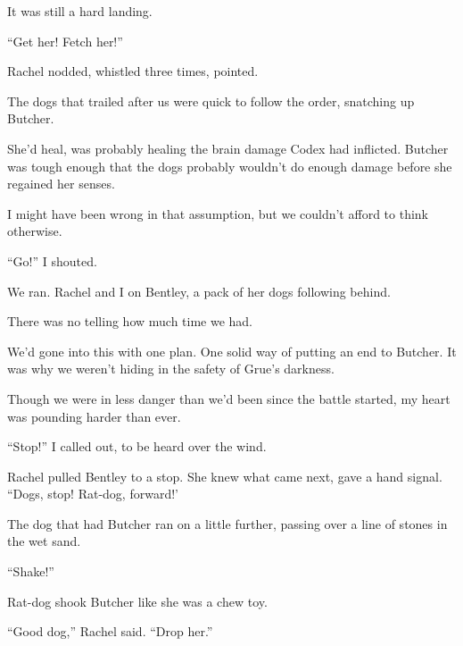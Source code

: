 It was still a hard landing.



``Get her!  Fetch her!''



Rachel nodded, whistled three times, pointed.



The dogs that trailed after us were quick to follow the order, snatching up Butcher.



She'd heal, was probably healing the brain damage Codex had inflicted.  Butcher was tough enough that the dogs probably wouldn't do enough damage before she regained her senses.



I might have been wrong in that assumption, but we couldn't afford to think otherwise.



``Go!''  I shouted.



We ran.  Rachel and I on Bentley, a pack of her dogs following behind.



There was no telling how much time we had.



We'd gone into this with one plan.  One solid way of putting an end to Butcher.  It was why we weren't hiding in the safety of Grue's darkness.



Though we were in less danger than we'd been since the battle started, my heart was pounding harder than ever.



``Stop!'' I called out, to be heard over the wind.



Rachel pulled Bentley to a stop.  She knew what came next, gave a hand signal.  ``Dogs, stop!  Rat-dog, forward!'



The dog that had Butcher ran on a little further, passing over a line of stones in the wet sand.



``Shake!''



Rat-dog shook Butcher like she was a chew toy.



``Good dog,'' Rachel said.  ``Drop her.''



